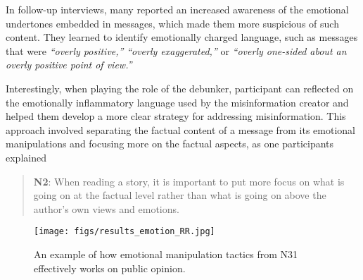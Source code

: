 In follow-up interviews, many reported an increased awareness of the emotional undertones embedded in messages, which made them more suspicious of such content. They learned to identify emotionally charged language, such as messages that were \textit{“overly positive,”} \textit{“overly exaggerated,”} or \textit{“overly one-sided about an overly positive point of view.”}

Interestingly, when playing the role of the debunker, participant can reflected on the emotionally inflammatory language used by the misinformation creator and helped them develop a more clear strategy for addressing misinformation. This approach involved separating the factual content of a message from its emotional manipulations and focusing more on the factual aspects, as one participants explained 
\begin{quote}
    \textbf{N2}:
    When reading a story, it is important to put more focus on what is going on at the factual level rather than what is going on above the author's own views and emotions. 
\end{quote}
\begin{figure}
    \centering
    \texttt{[image: figs/results\_emotion\_RR.jpg]}
    \caption{An example of how emotional manipulation tactics from N31 effectively works on public opinion.}
    \label{fig:emotion}
\end{figure}


